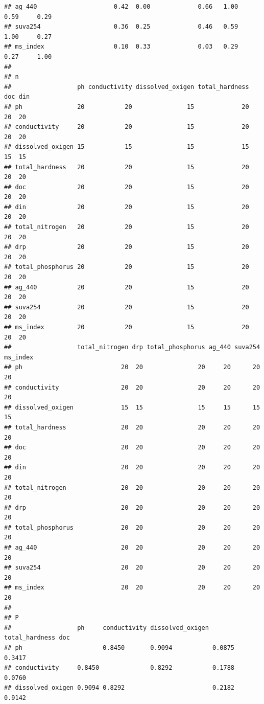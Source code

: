 \documentclass[
]{book}
\begin{document}
\begin{verbatim}
## ag_440                     0.42  0.00             0.66   1.00    0.59     0.29
## suva254                    0.36  0.25             0.46   0.59    1.00     0.27
## ms_index                   0.10  0.33             0.03   0.29    0.27     1.00
## 
## n
##                  ph conductivity dissolved_oxigen total_hardness doc din
## ph               20           20               15             20  20  20
## conductivity     20           20               15             20  20  20
## dissolved_oxigen 15           15               15             15  15  15
## total_hardness   20           20               15             20  20  20
## doc              20           20               15             20  20  20
## din              20           20               15             20  20  20
## total_nitrogen   20           20               15             20  20  20
## drp              20           20               15             20  20  20
## total_phosphorus 20           20               15             20  20  20
## ag_440           20           20               15             20  20  20
## suva254          20           20               15             20  20  20
## ms_index         20           20               15             20  20  20
##                  total_nitrogen drp total_phosphorus ag_440 suva254 ms_index
## ph                           20  20               20     20      20       20
## conductivity                 20  20               20     20      20       20
## dissolved_oxigen             15  15               15     15      15       15
## total_hardness               20  20               20     20      20       20
## doc                          20  20               20     20      20       20
## din                          20  20               20     20      20       20
## total_nitrogen               20  20               20     20      20       20
## drp                          20  20               20     20      20       20
## total_phosphorus             20  20               20     20      20       20
## ag_440                       20  20               20     20      20       20
## suva254                      20  20               20     20      20       20
## ms_index                     20  20               20     20      20       20
## 
## P
##                  ph     conductivity dissolved_oxigen total_hardness doc   
## ph                      0.8450       0.9094           0.0875         0.3417
## conductivity     0.8450              0.8292           0.1788         0.0760
## dissolved_oxigen 0.9094 0.8292                        0.2182         0.9142

\end{verbatim}
\end{document}

